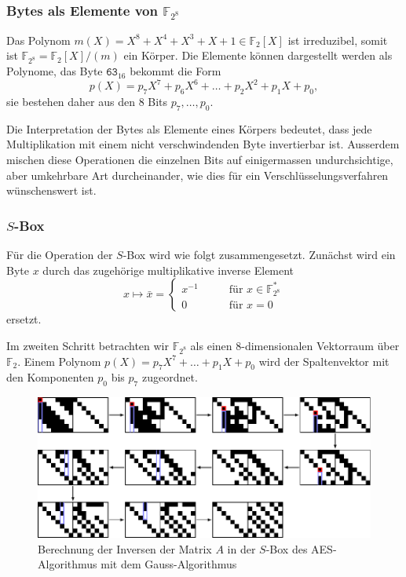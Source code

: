 \subsubsection{Bytes als Elemente von $\mathbb{F}_{2^8}$}
Das Polynom $m(X)=X^8+X^4+X^3+X+1\in \mathbb{F}_2[X]$ ist irreduzibel,
somit ist $\mathbb{F}_{2^8} = \mathbb{F}_2[X]/(m)$ ein Körper.
Die Elemente können dargestellt werden als Polynome, das Byte
$\texttt{63}_{16}$ bekommt die Form
\[
p(X) = p_7X^7 + p_6X^6 + \dots + p_2X^2+p_1X + p_0,
\]
sie bestehen daher aus den $8$ Bits $p_7,\dots,p_0$.

Die Interpretation der Bytes als Elemente eines Körpers bedeutet,
dass jede Multiplikation mit einem nicht verschwindenden Byte 
invertierbar ist.
Ausserdem mischen diese Operationen die einzelnen Bits auf einigermassen
undurchsichtige, aber umkehrbare Art durcheinander, wie dies für ein
Verschlüsselungsverfahren wünschenswert ist.

\subsubsection{$S$-Box}
Für die Operation der $S$-Box wird wie folgt zusammengesetzt.
Zunächst wird ein Byte $x$ durch das zugehörige multiplikative
inverse Element
\[
x\mapsto \bar{x} = \begin{cases}
x^{-1}&\qquad \text{für $x\in \mathbb{F}_{2^8}^*$}\\
0     &\qquad \text{für $x=0$}
\end{cases}
\]
ersetzt.

Im zweiten Schritt betrachten wir $\mathbb{F}_{2^8}$ als einen
$8$-dimensionalen Vektorraum über $\mathbb{F}_2$.
Einem Polynom $p(X)=p_7X^7 + \dots + p_1X+p_0$ wird der Spaltenvektor
mit den Komponenten $p_0$ bis $p_7$ zugeordnet.

\begin{figure}
\centering
\includegraphics[width=\textwidth]{chapters/90-crypto/images/sbox.pdf}
\caption{Berechnung der Inversen der Matrix $A$ in der $S$-Box  des
AES-Algorithmus mit dem Gauss-Algorithmus
\label{buch:crypto:fig:sbox}}
\end{figure}

